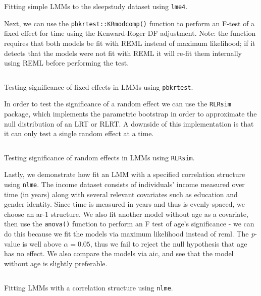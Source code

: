 \documentclass{report}
\begin{document}
\begin{listing}[h!]
\inputminted{r}{Example-Code/lme4_random_slopes.R}
\caption{Fitting simple LMMs to the sleepstudy dataset using \texttt{lme4}.}
\label{listing:lme4-example}
\end{listing}

Next, we can use the \texttt{pbkrtest::KRmodcomp()} function to perform an F-test of a fixed effect for time using the Kenward-Roger DF adjustment. Note: the function requires that both models be fit with REML instead of maximum likelihood; if it detects that the models were not fit with REML it will re-fit them internally using REML before performing the test. 

\begin{listing}[h!]
\inputminted{r}{Example-Code/lme4_kr_comparison.R}
\caption{Testing significance of fixed effects in LMMs using \texttt{pbkrtest}.}
\label{listing:pbkrtest-example}
\end{listing}

In order to test the significance of a random effect we can use the \texttt{RLRsim} package, which implements the parametric bootstrap in order to approximate the null distribution of an LRT or RLRT. A downside of this implementation is that it can only test a single random effect at a time. 

\begin{listing}[h!]
\inputminted{r}{Example-Code/lme4_rlrt.R}
\caption{Testing significance of random effects in LMMs using \texttt{RLRsim}.}
\label{listing:rlrsim-example}
\end{listing}

Lastly, we demonstrate how fit an LMM with a specified correlation structure using \texttt{nlme}. The income dataset consists of individuals' income measured over time (in years) along with several relevant covariates such as education and gender identity. Since time is measured in years and thus is evenly-spaced, we choose an \gls{ar}-1 structure. We also fit another model without age as a covariate, then use the \texttt{anova()} function to perform an F test of age's significance - we can do this because we fit the models via maximum likelihood instead of \gls{reml}. The \textit{p}-value is well above $\alpha = 0.05$, thus we fail to reject the null hypothesis that age has no effect. We also compare the models via \gls{aic}, and see that the model without age is slightly preferable. 

\begin{listing}[h!]
\inputminted{r}{Example-Code/nlme_correlation_structure.R}
\caption{Fitting LMMs with a correlation structure using \texttt{nlme}.}
\label{listing:nlme-example}
\end{listing}
\end{document}
